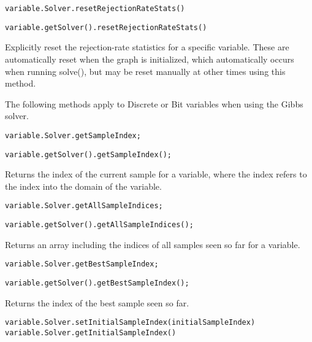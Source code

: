 \ifmatlab
\begin{lstlisting}
variable.Solver.resetRejectionRateStats()
\end{lstlisting}
\fi

\ifjava
\begin{lstlisting}
variable.getSolver().resetRejectionRateStats()
\end{lstlisting}
\fi

Explicitly reset the rejection-rate statistics for a specific variable.  These are automatically reset when the graph is initialized, which automatically occurs when running solve(), but may be reset manually at other times using this method.




The following methods apply to Discrete or Bit variables when using the Gibbs solver.

\ifmatlab
\begin{lstlisting}
variable.Solver.getSampleIndex;
\end{lstlisting}
\fi

\ifjava
\begin{lstlisting}
variable.getSolver().getSampleIndex();
\end{lstlisting}
\fi

Returns the index of the current sample for a variable, where the index refers to the index into the domain of the variable.

\ifmatlab
\begin{lstlisting}
variable.Solver.getAllSampleIndices;
\end{lstlisting}
\fi

\ifjava
\begin{lstlisting}
variable.getSolver().getAllSampleIndices();
\end{lstlisting}
\fi

Returns an array including the indices of all samples seen so far for a variable.

\ifmatlab
\begin{lstlisting}
variable.Solver.getBestSampleIndex;
\end{lstlisting}
\fi

\ifjava
\begin{lstlisting}
variable.getSolver().getBestSampleIndex();
\end{lstlisting}
\fi

Returns the index of the best sample seen so far.


\ifmatlab
\begin{lstlisting}
variable.Solver.setInitialSampleIndex(initialSampleIndex)
variable.Solver.getInitialSampleIndex()
\end{lstlisting}
\fi

